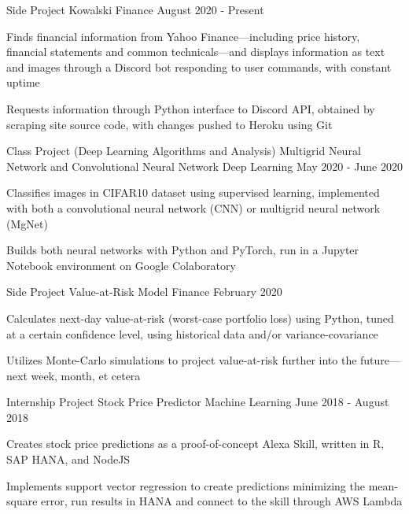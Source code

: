 
\begin{cventries}
  \cventry
    {Side Project} %
    {Kowalski} %
    {Finance} %
    {August 2020 - Present} %
    {
      \begin{cvitems} %
        \item {Finds financial information from Yahoo Finance---including price history, financial statements and common technicals---and displays information as text and images through a Discord bot responding to user commands, with constant uptime}
		\item {Requests information through Python interface to Discord API, obtained by scraping site source code, with changes pushed to Heroku using Git}
      \end{cvitems}
    }
  \vspace{2mm}
  \cventry
    {Class Project (Deep Learning Algorithms and Analysis)} %
    {Multigrid Neural Network and Convolutional Neural Network} %
    {Deep Learning} %
    {May 2020 - June 2020} %
    {
      \begin{cvitems} %
		\item {Classifies images in CIFAR10 dataset using supervised learning, implemented with both a convolutional neural network (CNN) or multigrid neural network (MgNet)}
		\item {Builds both neural networks with Python and PyTorch, run in a Jupyter Notebook environment on Google Colaboratory}
      \end{cvitems}
    }
  \vspace{2mm}
  \cventry
    {Side Project} %
    {Value-at-Risk Model} %
    {Finance} %
    {February 2020} %
    {
      \begin{cvitems} %
        \item {Calculates next-day value-at-risk (worst-case portfolio loss) using Python, tuned at a certain confidence level, using historical data and/or variance-covariance}
        \item {Utilizes Monte-Carlo simulations to project value-at-risk further into the future---next week, month, et cetera}
      \end{cvitems}
    }
  \vspace{2mm}
  \cventry
    {Internship Project}
    {Stock Price Predictor}
    {Machine Learning}
    {June 2018 - August 2018}
    {
      \begin{cvitems}
        \item {Creates stock price predictions as a proof-of-concept Alexa Skill, written in R, SAP HANA, and NodeJS}
        \item {Implements support vector regression to create predictions minimizing the mean-square error, run results in HANA and connect to the skill through AWS Lambda}
      \end{cvitems}
    }
\end{cventries}